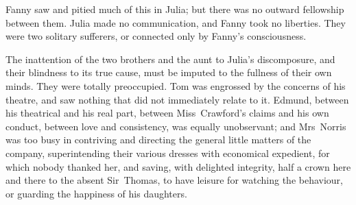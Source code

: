 Fanny saw and pitied much of this in Julia; but there was no outward fellowship between them. Julia made no communication, and Fanny took no liberties. They were two solitary sufferers, or connected only by Fanny's consciousness.

The inattention of the two brothers and the aunt to Julia's discomposure, and their blindness to its true cause, must be imputed to the fullness of their own minds. They were totally preoccupied. Tom was engrossed by the concerns of his theatre, and saw nothing that did not immediately relate to it. Edmund, between his theatrical and his real part, between Miss~Crawford's claims and his own conduct, between love and consistency, was equally unobservant; and Mrs~Norris was too busy in contriving and directing the general little matters of the company, superintending their various dresses with economical expedient, for which nobody thanked her, and saving, with delighted integrity, half a crown here and there to the absent Sir~Thomas, to have leisure for watching the behaviour, or guarding the happiness of his daughters. 